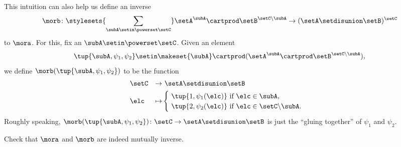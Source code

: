 This intuition can also help us define an inverse
\begin{equation}
    \morb \colon \stylesets{\sum_{\subA \setin \powerset \setC}} \setA^\subA \cartprod \setB^{\setC \backslash \subA} \to (\setA \setdisunion \setB)^{\setC}
\end{equation}
to $\mora$.
For this, fix an $\subA \setin \powerset \setC$.
Given an element
\begin{equation}
    \tup{\subA, \psi_1, \psi_2} \setin \makeset{\subA} \cartprod (\setA^{\subA} \cartprod \setB^{\setC \backslash \subA} ),
\end{equation}
we define $\morb(\tup{\subA, \psi_1, \psi_2})$ to be the function
\begin{equation}
    \begin{aligned}
         & \setC & \to     & \ \setA \setdisunion \setB \\
         & \elc  & \mapsto & \begin{cases} \  \tup{1, \psi_1(\elc)} \text{ if } \elc \in \subA, \\
                                 \ \tup{2, \psi_2(\elc)} \text{ if } \elc \in \setC \backslash \subA.\end{cases}
    \end{aligned}
\end{equation}
Roughly speaking, $\morb(\tup{\subA, \psi_1, \psi_2}) \colon \setC \to \setA \setdisunion \setB$ is just the ``gluing together'' of $\psi_1$ and $\psi_2$.

\begin{gradedexercise}
    Check that $\mora$ and $\morb$ are indeed mutually inverse.
\end{gradedexercise}



